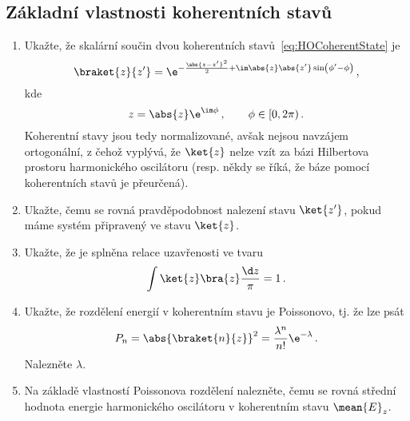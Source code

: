 \subsection{Základní vlastnosti koherentních stavů}
\label{sec:HOCoherentState}
\begin{enumerate}
\item 
    Ukažte, že skalární součin dvou koherentních stavů~\eqref{eq:HOCoherentState} je
    \begin{equation}			
        \label{eq:HOCoherentStateBraket}
        \braket{z}{z'}=\e^{-\frac{\abs{z-z'}^{2}}{2}
            +\im\abs{z}\abs{z'}\sin\left(\phi'-\phi\right)}\,,
    \end{equation}
    kde
    \begin{equation}
        \label{eq:z}
        z=\abs{z}\e^{\im\phi}\,,\qquad\phi\in[0,2\pi)\,.
    \end{equation}
    Koherentní stavy jsou tedy normalizované, avšak nejsou navzájem ortogonální, z čehož vyplývá, že $\ket{z}$ nelze vzít za bázi Hilbertova prostoru harmonického oscilátoru (resp. někdy se říká, že báze pomocí koherentních stavů je přeurčená).

\item
    Ukažte, čemu se rovná pravděpodobnost nalezení stavu $\ket{z'}$, 
    pokud máme systém připravený ve stavu $\ket{z}$.

\item
    Ukažte, že je splněna relace uzavřenosti ve tvaru
    \begin{equation}
        \int\ket{z}\bra{z}\frac{\d z}{\pi}=1\,.
    \end{equation}

\item
    Ukažte, že rozdělení energií v koherentním stavu je Poissonovo, tj. že lze psát
    \begin{equation}
        P_{n}=\abs{\braket{n}{z}}^{2}=\frac{\lambda^{n}}{n!}\e^{-\lambda}\,.
    \end{equation}
    Nalezněte $\lambda$.

\item 
    Na základě vlastností Poissonova rozdělení nalezněte, 
    čemu se rovná střední hodnota energie harmonického oscilátoru
    v koherentním stavu $\mean{E}_{z}$.
\end{enumerate}
	
